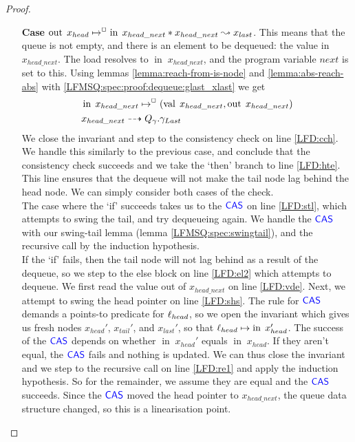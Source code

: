 \documentclass[a4paper, 11pt]{report}
\newcommand{\nIn}[1]{\operatorname{in} \; #1}
\newcommand{\nVal}[1]{\operatorname{val} \; #1}
\newcommand{\nOut}[1]{\operatorname{out} \; #1}
\newcommand{\Qg}{Q_\gname}
\newcommand{\isNode}[1]{\nIn{#1} \mapsto^{\persistently} (\nVal{#1}, \nOut{#1})}
\newcommand{\reach}[2]{#1 \leadsto #2}
\newcommand{\ar}[2]{#1 \dashrightarrow #2}
\begin{document}
\begin{proof}
\begin{itemize}
\begin{itemize}
      \item[\textbf{Case}] $\nOut{x_{head} \mapsto^{\persistently} \nIn{x_{head\_next}}} \star \reach{x_{head\_next}}{x_{last}}$. This means that the queue is not empty, and there is an element to be dequeued: the value in $x_{head\_next}$. The load resolves to $\nIn{x_{head\_next}}$, and the program variable $next$ is set to this. Using lemmas \ref{lemma:reach-from-is-node} and \ref{lemma:abs-reach-abs} with \ref{LFMSQ:spec:proof:dequeue:glast_xlast} we get
      \begin{align}
        &\isNode{x_{head\_next}}\label{LFMSQ:spec:proof:dequeue:x_headnext_node}\\
        &\ar{x_{head\_next}}{\Qg.\gname_{Last}}\label{LFMSQ:spec:proof:dequeue:x_headnext_glast}
      \end{align}
      We close the invariant and step to the consistency check on line \ref{LFD:cch}. We handle this similarly to the previous case, and conclude that the consistency check succeeds and we take the `then' branch to line \ref{LFD:hte}. This line ensures that the dequeue will not make the tail node lag behind the head node. We can simply consider both cases of the check.\\
      The case where the `if' succeeds takes us to the $\textsf{\color{blue} CAS}$ on line \ref{LFD:stl}, which attempts to swing the tail, and try dequeueing again. We handle the $\textsf{\color{blue} CAS}$ with our swing-tail lemma (lemma \ref{LFMSQ:spec:swingtail}), and the recursive call by the induction hypothesis.\\
      If the `if' fails, then the tail node will not lag behind as a result of the dequeue, so we step to the else block on line \ref{LFD:el2} which attempts to dequeue. We first read the value out of $x_{head\_next}$ on line \ref{LFD:vde}. Next, we attempt to swing the head pointer on line \ref{LFD:shs}. The rule for $\textsf{\color{blue} CAS}$ demands a points-to predicate for $\ell_{head}$, so we open the invariant which gives us fresh nodes $x_{head}'$, $x_{tail}'$, and $x_{last}'$, so that $\loc_{head} \mapsto \nIn{x_{head}}'$. The success of the $\textsf{\color{blue} CAS}$ depends on whether $\nIn{x_{head}'}$ equals $\nIn{x_{head}}$. If they aren't equal, the $\textsf{\color{blue} CAS}$ fails and nothing is updated. We can thus close the invariant and we step to the recursive call on line \ref{LFD:re1} and apply the induction hypothesis. So for the remainder, we assume they are equal and the $\textsf{\color{blue} CAS}$ succeeds. Since the $\textsf{\color{blue} CAS}$ moved the head pointer to $x_{head\_next}$, the queue data structure changed, so this is a linearisation point.\\

\end{itemize}
\end{itemize}
\end{proof}
\end{document}
